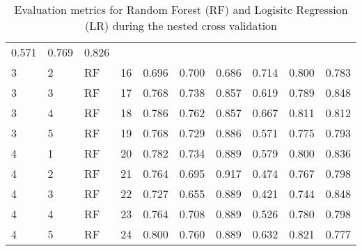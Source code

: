 \begin{table}[ht]
\begin{adjustbox}{width=\textwidth}
\begin{tabular}{llllrrrrrr}
 0.571 & 0.769 & 0.826 \\
   3 &           2 &    RF &          16 & 0.696 &  0.700 &        0.686 &      
 
 0.714 & 0.800 & 0.783 \\
   3 &           3 &    RF &          17 & 0.768 &  0.738 &        0.857 &      
 
 0.619 & 0.789 & 0.848 \\
   3 &           4 &    RF &          18 & 0.786 &  0.762 &        0.857 &      
 
 0.667 & 0.811 & 0.812 \\
   3 &           5 &    RF &          19 & 0.768 &  0.729 &        0.886 &      
 
 0.571 & 0.775 & 0.793 \\
   4 &           1 &    RF &          20 & 0.782 &  0.734 &        0.889 &      
 
 0.579 & 0.800 & 0.836 \\
   4 &           2 &    RF &          21 & 0.764 &  0.695 &        0.917 &      
 
 0.474 & 0.767 & 0.798 \\
   4 &           3 &    RF &          22 & 0.727 &  0.655 &        0.889 &      
 
 0.421 & 0.744 & 0.848 \\
   4 &           4 &    RF &          23 & 0.764 &  0.708 &        0.889 &      
 
 0.526 & 0.780 & 0.798 \\
   4 &           5 &    RF &          24 & 0.800 &  0.760 &        0.889 &      
 
 0.632 & 0.821 & 0.777 \\
\end{tabular}
\end{adjustbox}
\caption{Evaluation metrics for Random Forest (RF) and Logisitc Regression (LR) 
during the nested cross validation}
\label{tab:storage}
\end{table}
